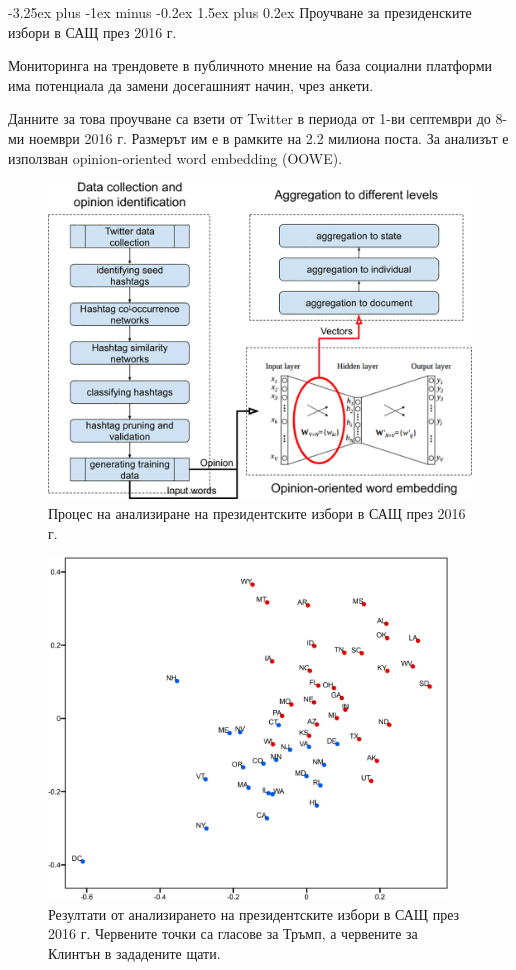 \documentclass{article}
\makeatletter
\renewcommand\paragraph{\@startsection{paragraph}{5}{\z@}%
{3.25ex \@plus1ex \@minus.2ex}%
{-1em}%
{\normalfont\normalsize\bfseries}}
\renewcommand{\paragraph}{\@startsection{paragraph}{4}{0ex}%
{-3.25ex plus -1ex minus -0.2ex}%
{1.5ex plus 0.2ex}%
{\normalfont\normalsize\bfseries}}
\makeatother
\begin{document}
    \paragraph{Проучване за президенските избори в САЩ през 2016 г.}

    Мониторинга на трендовете в публичното мнение на база социални платформи има потенциала да замени досегашният начин,
    чрез анкети.

    Данните за това проучване са взети от Twitter в периода от 1-ви септември до 8-ми ноември 2016 г. Размерът им е в
    рамките на 2.2 милиона поста. За анализът е използван opinion-oriented word embedding (OOWE). \cite{us-election-2016}

    \begin{figure}[H]
        \centering
        \captionsetup{justification=centering}
        \includegraphics{chapter-02/us-election-2016.png}
        \caption{Процес на анализиране на президентските избори в САЩ през 2016 г.}
    \end{figure}

    \begin{figure}[H]
        \centering
        \captionsetup{justification=centering}
        \includegraphics[width=400px, keepaspectratio]{chapter-02/us-election-2016-results.png}
        \caption{Резултати от анализирането на президентските избори в САЩ през 2016 г. Червените точки са гласове за Тръмп,
            а червените за Клинтън в зададените щати.}
    \end{figure}
\end{document}
